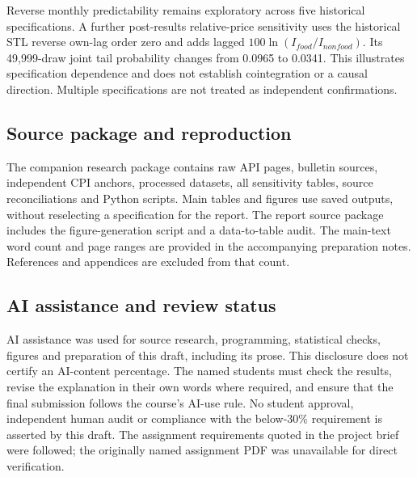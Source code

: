 \documentclass[11pt,a4paper]{article}
\begin{document}
Reverse monthly predictability remains exploratory across five historical specifications. A further post-results relative-price sensitivity uses the historical STL reverse own-lag order zero and adds lagged $100\ln(I_{food}/I_{nonfood})$. Its 49,999-draw joint tail probability changes from 0.0965 to 0.0341. This illustrates specification dependence and does not establish cointegration or a causal direction. Multiple specifications are not treated as independent confirmations.

\subsection*{Source package and reproduction}
The companion research package contains raw API pages, bulletin sources, independent CPI anchors, processed datasets, all sensitivity tables, source reconciliations and Python scripts. Main tables and figures use saved outputs, without reselecting a specification for the report. The report source package includes the figure-generation script and a data-to-table audit. The main-text word count and page ranges are provided in the accompanying preparation notes. References and appendices are excluded from that count.

\subsection*{AI assistance and review status}
AI assistance was used for source research, programming, statistical checks, figures and preparation of this draft, including its prose. This disclosure does not certify an AI-content percentage. The named students must check the results, revise the explanation in their own words where required, and ensure that the final submission follows the course's AI-use rule. No student approval, independent human audit or compliance with the below-30\% requirement is asserted by this draft. The assignment requirements quoted in the project brief were followed; the originally named assignment PDF was unavailable for direct verification.
\end{document}
